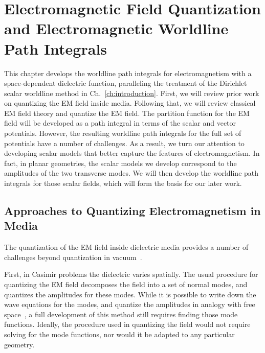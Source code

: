\chapter{Electromagnetic Field Quantization and Electromagnetic Worldline Path Integrals}

\label{ch:EM_quantization}

This chapter develops the worldline path integrals for electromagnetism with a space-dependent
dielectric function, paralleling the treatment of the Dirichlet scalar worldline method in Ch.~\ref{ch:introduction}.
First, we will review prior work on quantizing the EM field inside media.
Following that, we will review classical EM field theory and quantize the EM field.
The partition function for the EM field will be developed as a path integral in terms of the scalar and vector potentials.
However, the resulting worldline path integrals for the full set of potentials have a number of challenges.
As a result, we turn our attention to developing scalar models that better capture the features
of electromagnetism.  In fact, in planar geometries, the scalar models we develop correspond to 
the amplitudes of the two transverse modes.  
We will then develop the worldline path integrals for those scalar fields, which will form
the basis for our later work.  

\section{Approaches to Quantizing Electromagnetism in Media}

The quantization of the EM field inside dielectric media provides a number of challenges 
beyond quantization in vacuum~\cite{Huttner1992,Dung1998,Bechler1999,Bordag1998,Rahi2009,Reid2013}.  

 First, in Casimir problems the dielectric varies spatially.  The usual procedure for
quantizing the EM field decomposes the field into a set of normal modes, and quantizes the amplitudes for these
modes.  While it is possible to write down the wave equations for the modes, and quantize the amplitudes
 in analogy with free space~\cite{Glauber1991}, a full development of this method still requires finding those mode functions.
 Ideally, the procedure used in quantizing the field would not require solving for the mode functions, 
 nor would it be adapted to any particular geometry.   

